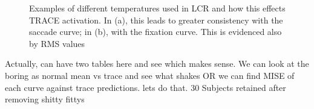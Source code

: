 \documentclass{article}
\begin{document}
\begin{figure}[H]
    \centering

    \caption{Examples of different temperatures used in LCR and how this effects TRACE activation. In (a), this leads to greater consistency with the saccade curve; in (b), with the fixation curve. This is evidenced also by RMS values}
\label{fig:shades_of_trace2}
\end{figure}


Actually, can have two tables here and see which makes sense. We can look at the boring as normal mean vs trace and see what shakes OR we can find MISE of each curve against trace predictions. lets do that. 30 Subjects retained after removing shitty fittys
\end{document}
